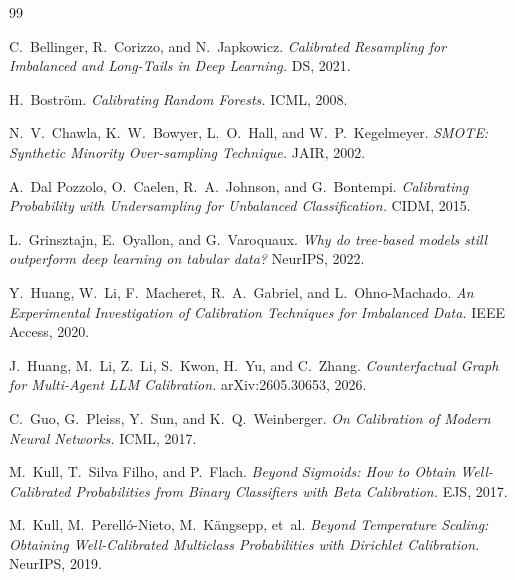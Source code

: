 \documentclass[11pt]{article}
\begin{document}

\begin{thebibliography}{99}

 C.~Bellinger, R.~Corizzo, and N.~Japkowicz.
\newblock \textit{Calibrated Resampling for Imbalanced and Long-Tails in Deep Learning.} DS, 2021.

 H.~Bostr\"{o}m.
\newblock \textit{Calibrating Random Forests.} ICML, 2008.

 N.~V.~Chawla, K.~W.~Bowyer, L.~O.~Hall, and W.~P.~Kegelmeyer.
\newblock \textit{SMOTE: Synthetic Minority Over-sampling Technique.} JAIR, 2002.

 A.~Dal Pozzolo, O.~Caelen, R.~A.~Johnson, and G.~Bontempi.
\newblock \textit{Calibrating Probability with Undersampling for Unbalanced Classification.} CIDM, 2015.

 L.~Grinsztajn, E.~Oyallon, and G.~Varoquaux.
\newblock \textit{Why do tree-based models still outperform deep learning on tabular data?} NeurIPS, 2022.

 Y.~Huang, W.~Li, F.~Macheret, R.~A.~Gabriel, and L.~Ohno-Machado.
\newblock \textit{An Experimental Investigation of Calibration Techniques for Imbalanced Data.} IEEE Access, 2020.

 J.~Huang, M.~Li, Z.~Li, S.~Kwon, H.~Yu, and C.~Zhang.
\newblock \textit{Counterfactual Graph for Multi-Agent LLM Calibration.} arXiv:2605.30653, 2026.

 C.~Guo, G.~Pleiss, Y.~Sun, and K.~Q.~Weinberger.
\newblock \textit{On Calibration of Modern Neural Networks.} ICML, 2017.

 M.~Kull, T.~Silva Filho, and P.~Flach.
\newblock \textit{Beyond Sigmoids: How to Obtain Well-Calibrated Probabilities from Binary Classifiers with Beta Calibration.} EJS, 2017.

 M.~Kull, M.~Perell\'{o}-Nieto, M.~K\"{a}ngsepp, et~al.
\newblock \textit{Beyond Temperature Scaling: Obtaining Well-Calibrated Multiclass Probabilities with Dirichlet Calibration.} NeurIPS, 2019.


\end{thebibliography}
\end{document}
